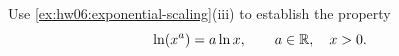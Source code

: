 \begin{exercise}
  \label{ex:hw06:logarithm-power-law}
  Use \autoref{ex:hw06:exponential-scaling}(iii) to establish the property
  \[
    \ln(x^a)=a\ln x,\qquad a\in\mathbb{R},\quad x>0.
  \]
\end{exercise}
